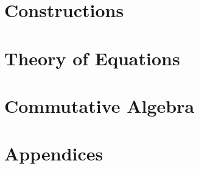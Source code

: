 \documentclass{book}
\newcounter{t}
\theoremstyle{definition}
\begin{document}
\frontmatter



\tableofcontents

\setcounter{chapter}{-1}

\mainmatter



\part{Constructions}
% 





\part{Theory of Equations}



\part{Commutative Algebra}

% 
% 

% 

\appendix{}
\part*{Appendices}



\backmatter



\end{document}
